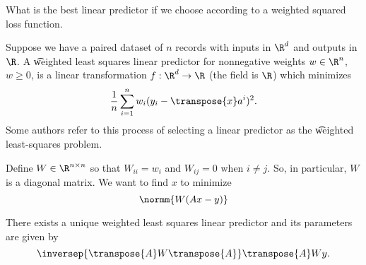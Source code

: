 

What is the best linear predictor if we choose according to a weighted squared loss function.


Suppose we have a paired dataset of $n$ records with inputs in $\R^d$ and outputs in $\R$.
A \t{weighted least squares linear predictor} for nonnegative weights $w \in \R^n$, $w \geq 0$, is a linear transformation $f: \R^d \to \R$ (the field is $\R$) which minimizes
\[
  \frac{1}{n} \sum_{i = 1}^{n} w_i(y_i - \transpose{x}a^i)^2.
\]
Some authors refer to this process of selecting a linear predictor as the \t{weighted least-squares problem}.

Define $W \in \R^{n \times n}$ so that $W_{ii} = w_i$ and $W_{ij} = 0$ when $i \neq j$.
So, in particular, $W$ is a diagonal matrix.
We want to find $x$ to minimize
\[
  \normm{W(Ax - y)}
\]


\begin{proposition}
There exists a unique weighted least squares linear predictor and its parameters are given by
\[
  \inversep{\transpose{A}W\transpose{A}}\transpose{A}Wy.
\]
\end{proposition}



\blankpage
